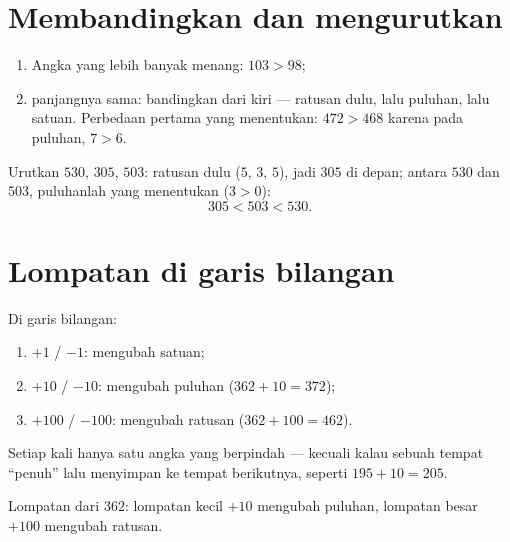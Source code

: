 \section{Membandingkan dan mengurutkan}

\begin{method}\label{met:g2:numbers:compare}
\begin{enumerate}
  \item Angka yang lebih banyak menang: $103 > 98$;
  \item panjangnya sama: bandingkan dari kiri --- ratusan dulu, lalu
        puluhan, lalu satuan. Perbedaan pertama yang menentukan:
        $472 > 468$ karena pada puluhan, $7 > 6$.
\end{enumerate}
\end{method}

\begin{example}\label{ex:g2:numbers:order}
Urutkan $530$, $305$, $503$: ratusan dulu ($5$, $3$, $5$), jadi
$305$ di depan; antara $530$ dan $503$, puluhanlah yang menentukan ($3 > 0$):
\[
305 < 503 < 530 .
\]
\end{example}

\section{Lompatan di garis bilangan}

\begin{method}\label{met:g2:numbers:jumps}
Di garis bilangan:
\begin{enumerate}
  \item $+1$ / $-1$: mengubah satuan;
  \item $+10$ / $-10$: mengubah puluhan ($362 + 10 = 372$);
  \item $+100$ / $-100$: mengubah ratusan ($362 + 100 = 462$).
\end{enumerate}
Setiap kali hanya satu angka yang berpindah --- kecuali kalau sebuah
tempat ``penuh'' lalu menyimpan ke tempat berikutnya, seperti
$195 + 10 = 205$.
\end{method}

\begin{omfigure}

{\small Lompatan dari $362$: lompatan kecil $+10$ mengubah puluhan,
lompatan besar $+100$ mengubah ratusan.}
\end{omfigure}

